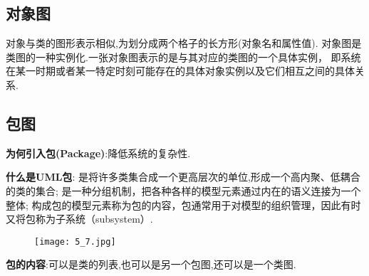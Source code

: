 \documentclass[../main.tex]{subfiles}
\begin{document}
\subsection{对象图}
\noindent 对象与类的图形表示相似,为划分成两个格子的长方形(对象名和属性值).
对象图是类图的一种实例化.一张对象图表示的是与其对应的类图的一个具体实例，
即系统在某一时期或者某一特定时刻可能存在的具体对象实例以及它们相互之间的具体关系.
\subsection{包图}
\noindent \textbf{为何引入包(Package)}:降低系统的复杂性.

\noindent \textbf{什么是UML包}:
是将许多类集合成一个更高层次的单位,形成一个高内聚、低耦合的类的集合;
是一种分组机制，把各种各样的模型元素通过内在的语义连接为一个整体;
构成包的模型元素称为包的内容，包通常用于对模型的组织管理，因此有时又将包称为子系统（subsystem）.
\begin{figure}[H]
  \begin{center}
    \texttt{[image: 5\_7.jpg]}
  \end{center}
\end{figure}
\noindent \textbf{包的内容}:可以是类的列表,也可以是另一个包图,还可以是一个类图.
\end{document}
